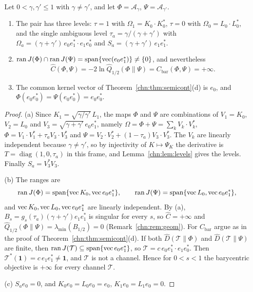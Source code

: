 \begin{proposition}\label{chn:prop:adlevels}
Let $0<\gamma,\gamma'\le1$ with $\gamma\ne\gamma'$, and let $\Phi=\mathcal A_\gamma$, $\Psi=\mathcal A_{\gamma'}$.
\begin{enumerate}
\item[(a)] The pair has three levels: $\tau=1$ with $\Omega_1=K_0\cdot K_0^*$, $\tau=0$ with $\Omega_0=L_0\cdot L_0^*$, and the single ambiguous level $\tau_a=\gamma/(\gamma+\gamma')$ with $\Omega_a=(\gamma+\gamma')\,e_0e_1^*\cdot e_1e_0^*$ and $S_a=(\gamma+\gamma')\,e_1e_1^*$.
\item[(b)] $\operatorname{ran}J(\Phi)\cap\operatorname{ran}J(\Psi)=\operatorname{span}\{\operatorname{vec}(e_0e_1^*)\}\ne\{0\}$, and nevertheless
\[
\widehat C(\Phi,\Psi)=-2\ln\widehat Q_{1/2}(\Phi\|\Psi)=C_{\mathrm{bar}}(\Phi,\Psi)=+\infty .
\]
\item[(c)] The common kernel vector of Theorem~\ref{chn:thm:semicont}(d) is $e_0$, and $\Phi(e_0e_0^*)=\Psi(e_0e_0^*)=e_0e_0^*$.
\end{enumerate}
\end{proposition}

\begin{proof}
(a) Since $K_1=\sqrt{\gamma/\gamma'}\,L_1$, the maps $\Phi$ and $\Psi$ are combinations of $V_1=K_0$, $V_2=L_0$ and $V_3=\sqrt{\gamma+\gamma'}\,e_0e_1^*$, namely $\Omega=\Phi+\Psi=\sum_kV_k\cdot V_k^*$, $\Phi=V_1\cdot V_1^*+\tau_aV_3\cdot V_3^*$ and $\Psi=V_2\cdot V_2^*+(1-\tau_a)V_3\cdot V_3^*$. The $V_k$ are linearly independent because $\gamma\ne\gamma'$, so by injectivity of $K\mapsto\Psi_K$ the derivative is $T=\operatorname{diag}(1,0,\tau_a)$ in this frame, and Lemma~\ref{chn:lem:levels} gives the levels. Finally $S_a=V_3^*V_3$.

(b) The ranges are
\[
\operatorname{ran}J(\Phi)=\operatorname{span}\{\operatorname{vec} K_0,\operatorname{vec} e_0e_1^*\},\qquad\operatorname{ran}J(\Psi)=\operatorname{span}\{\operatorname{vec} L_0,\operatorname{vec} e_0e_1^*\},
\]
and $\operatorname{vec} K_0,\operatorname{vec} L_0,\operatorname{vec} e_0e_1^*$ are linearly independent. By (a), $B_s=g_s(\tau_a)(\gamma+\gamma')e_1e_1^*$ is singular for every $s$, so $\widehat C=+\infty$ and $\widehat Q_{1/2}(\Phi\|\Psi)=\lambda_{\min}(B_{1/2})=0$ (Remark~\ref{chn:rem:geom}). For $C_{\mathrm{bar}}$ argue as in the proof of Theorem~\ref{chn:thm:semicont}(d). If both $\widehat D(\mathcal T\|\Phi)$ and $\widehat D(\mathcal T\|\Psi)$ are finite, then $\operatorname{ran}J(\mathcal T)\subseteq\operatorname{span}\{\operatorname{vec} e_0e_1^*\}$, so $\mathcal T=c\,e_0e_1^*\cdot e_1e_0^*$. Then $\mathcal T^*(\mathbf 1)=c\,e_1e_1^*\ne\mathbf 1$, and $\mathcal T$ is not a channel. Hence for $0<s<1$ the barycentric objective is $+\infty$ for every channel $\mathcal T$.

(c) $S_ae_0=0$, and $K_0e_0=L_0e_0=e_0$, $K_1e_0=L_1e_0=0$.
\end{proof}

